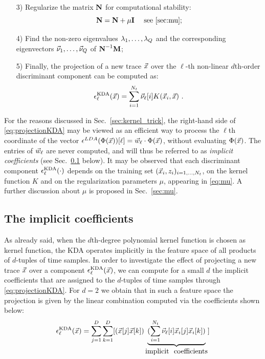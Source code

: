 \begin{itemize}
\item[3)] Regularize the  matrix $\textbf{N}$ for computational stability:
\begin{equation}\label{eq:mu}
\textbf{N} = \textbf{N} + \mu  \textbf{I} \quad \mbox{ see \ref{sec:mu};}
\end{equation}

\item[4)]\label{point:eigs} Find the non-zero eigenvalues $\lambda_1, \dots, \lambda_Q$ and the corresponding eigenvectors $\vec{\nu}_1, \dots, \vec{\nu}_Q$ of $\textbf{N}^{-1}\textbf{M}$; 


\item[5)] Finally, the projection of a new trace $\vec{x}$ over the $\ell$-th non-linear $d$th-order discriminant component can be computed as:
\begin{equation}\label{eq:projectionKDA}
\epsilon^{\mathrm{KDA}}_{\ell}(\vec{x}) = \sum_{i=1}^{N_t}{\vec{\nu}}_\ell[i]K(\vec{x}_i, \vec{x}) \mbox{ .}
\end{equation} 

\end{itemize}
For the reasons discussed in Sec.~\ref{sec:kernel_trick}, the right-hand side of \eqref{eq:projectionKDA} may be viewed as an efficient way to process the $\ell$th coordinate of the vector $\epsilon^{LDA}(\Phi(\vec{x}))[\ell] = \vec{w}_{\ell} \cdot \Phi(\vec{x})$,
without evaluating $\Phi(\vec{x})$. The entries of $\vec{w}_{\ell}$ are never computed, and will thus be referred to as \emph{implicit coefficients} (see Sec.~\ref{sec:implicit} below). It may be observed that each discriminant component $\epsilon^{\mathrm{KDA}}_{\ell}(\cdot)$ depends on the training set $(\vec{x}_i, z_i)_{i=1, \dots , N_t}$, on the kernel function $K$ and on the regularization parameters $\mu$, appearing in \eqref{eq:mu}. A further discussion about $\mu$ is proposed in Sec.~\ref{sec:mu}.

\subsection{The implicit coefficients}\label{sec:implicit}
As already said, when the $d$th-degree  polynomial kernel function is chosen as kernel function, the KDA operates implicitly in the feature space of all products of $d$-tuples of time samples. In order to investigate the effect of projecting a new trace $\vec{x}$ over a component $\epsilon^{\mathrm{KDA}}_{\ell}(\vec{x})$, we can compute for a small $d$ the implicit coefficients that are assigned to the $d$-tuples of time samples through \eqref{eq:projectionKDA}. For $d=2$ we obtain that in such a feature space the projection is given by the linear combination computed via the coefficients shown below: 
\begin{equation}\label{eq:implicit}
\extract^{\mathrm{KDA}}_{\ell}(\vLeakVec) = \sum_{j=1}^\traceLength \sum_{k=1}^\traceLength[ (\vLeakVec[j]\vLeakVec[k])\underbrace{(\sum_{i=1}^{\nbTrainingTraces}\nununu_{\ell}[i] \vLeakVec_i[j]\vLeakVec_{i}[k])}_{\mbox{implicit \ coefficients}}]
\end{equation}




